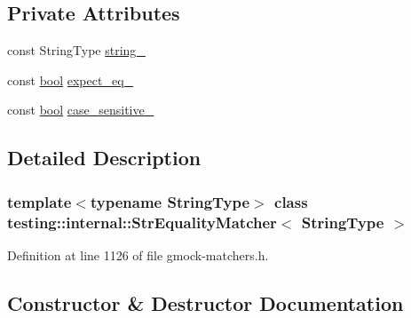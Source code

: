 \subsection*{Private Attributes}
\begin{DoxyCompactItemize}
\item 
const String\+Type \hyperlink{classtesting_1_1internal_1_1StrEqualityMatcher_af6967de4d57d461f3e7c98bece4d1f48}{string\+\_\+}
\item 
const \hyperlink{classbool}{bool} \hyperlink{classtesting_1_1internal_1_1StrEqualityMatcher_a95f7c07612ee34d8ebd1dc97c707901d}{expect\+\_\+eq\+\_\+}
\item 
const \hyperlink{classbool}{bool} \hyperlink{classtesting_1_1internal_1_1StrEqualityMatcher_adabf80fed2710950dd44b2a08fa5930c}{case\+\_\+sensitive\+\_\+}
\end{DoxyCompactItemize}


\subsection{Detailed Description}
\subsubsection*{template$<$typename String\+Type$>$\newline
class testing\+::internal\+::\+Str\+Equality\+Matcher$<$ String\+Type $>$}



Definition at line 1126 of file gmock-\/matchers.\+h.



\subsection{Constructor \& Destructor Documentation}
\mbox{\label{classtesting_1_1internal_1_1StrEqualityMatcher_a613006d82018b18ef8fded721f70f860}} 
